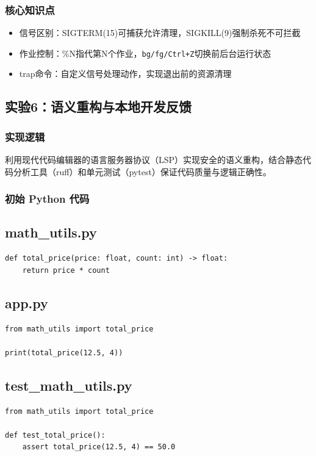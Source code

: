 \documentclass[12pt, a4paper]{ctexart}
\begin{document}
\subsubsection{核心知识点}
\begin{itemize}
    \item 信号区别：SIGTERM(15)可捕获允许清理，SIGKILL(9)强制杀死不可拦截
    \item 作业控制：\%N指代第N个作业，\texttt{bg/fg/Ctrl+Z}切换前后台运行状态
    \item trap命令：自定义信号处理动作，实现退出前的资源清理
\end{itemize}

\subsection{实验6：语义重构与本地开发反馈}
\subsubsection{实现逻辑}
利用现代代码编辑器的语言服务器协议（LSP）实现安全的语义重构，结合静态代码分析工具（ruff）和单元测试（pytest）保证代码质量与逻辑正确性。
\subsubsection{初始 Python 代码}
\subsection*{math\_utils.py}
\begin{lstlisting}
def total_price(price: float, count: int) -> float:
    return price * count
\end{lstlisting}

\subsection*{app.py}
\begin{lstlisting}
from math_utils import total_price

print(total_price(12.5, 4))
\end{lstlisting}

\subsection*{test\_math\_utils.py}
\begin{lstlisting}
from math_utils import total_price

def test_total_price():
    assert total_price(12.5, 4) == 50.0
\end{lstlisting}
\end{document}
